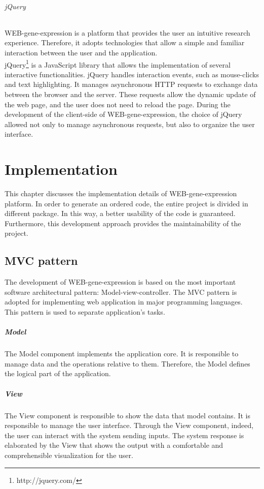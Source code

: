 \documentclass[a4paper]{report}
\begin{document}
\subparagraph{jQuery}
 WEB-gene-expression is a platform that provides the user an intuitive research experience. Therefore, it adopts technologies that allow a simple and familiar interaction between the user and the application.\\
jQuery\footnote{http://jquery.com/} is a JavaScript library that allows the implementation of several interactive functionalities. jQuery handles interaction events, such as mouse-clicks and text highlighting. It manages asynchronous HTTP requests to exchange data between the browser and the server. These requests allow the dynamic update of the web page, and the user does not need to reload the page. During the development of the client-side of WEB-gene-expression, the choice of jQuery allowed not only to manage asynchronous requests, but also to organize the user interface. \\

\chapter{Implementation}
This chapter discusses the implementation details of WEB-gene-expression platform. In order to generate an ordered code, the entire project is divided in different package. In this way, a better usability of the code is guaranteed. Furthermore, this development approach provides the maintainability of the project.

\section{MVC pattern} \label{mvc}

The development of WEB-gene-expression is based on the most important software architectural pattern: Model-view-controller. The MVC pattern is adopted for implementing web application in major programming languages.\\
This pattern is used to separate application's tasks.


  \paragraph{Model} The Model component implements the application core. It is responsible to manage data and the operations relative to them. Therefore, the Model defines the logical part of the application.
  \paragraph{View} The View component is responsible to show the data that model contains. It is responsible to manage the user interface. Through the View component, indeed, the user can interact with the system sending inputs. The system response is elaborated by the View that shows the output with a comfortable and comprehensible visualization for the user.
\end{document}
